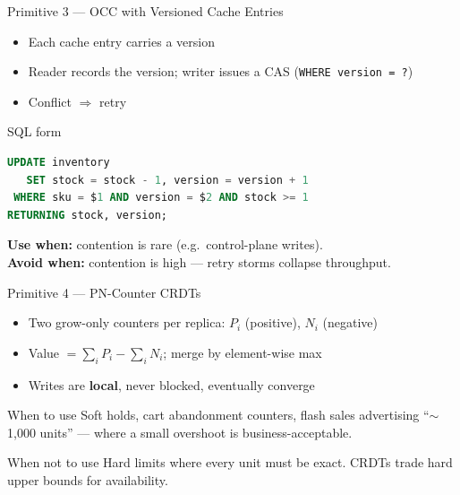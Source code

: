 \documentclass[aspectratio=169, 11pt]{beamer}
\begin{document}
\begin{frame}[fragile]{Primitive 3 --- OCC with Versioned Cache Entries}
\begin{itemize}
    \item Each cache entry carries a version
    \item Reader records the version; writer issues a CAS (\texttt{WHERE version = ?})
    \item Conflict $\Rightarrow$ retry
\end{itemize}
\begin{block}{SQL form}
\begin{lstlisting}[language=SQL]
UPDATE inventory
   SET stock = stock - 1, version = version + 1
 WHERE sku = $1 AND version = $2 AND stock >= 1
RETURNING stock, version;
\end{lstlisting}
\end{block}
\textbf{Use when:} contention is rare (e.g.\ control-plane writes). \\
\textbf{Avoid when:} contention is high --- retry storms collapse throughput.
\end{frame}

\begin{frame}{Primitive 4 --- PN-Counter CRDTs}
\begin{itemize}
    \item Two grow-only counters per replica: $P_i$ (positive), $N_i$ (negative)
    \item Value $= \sum_i P_i - \sum_i N_i$; merge by element-wise max
    \item Writes are \textbf{local}, never blocked, eventually converge
\end{itemize}
\begin{exampleblock}{When to use}
Soft holds, cart abandonment counters, flash sales advertising ``$\sim$1{,}000 units'' --- where a small overshoot is business-acceptable.
\end{exampleblock}
\begin{alertblock}{When not to use}
Hard limits where every unit must be exact. CRDTs trade hard upper bounds for availability.
\end{alertblock}
\end{frame}
\end{document}
